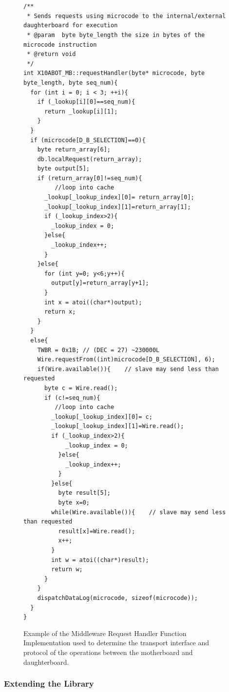 \begin{figure}
    \footnotesize
    {\fontsize{8}{6}\selectfont
    \begin{verbatim}


/**
 * Sends requests using microcode to the internal/external daughterboard for execution
 * @param  byte byte_length the size in bytes of the microcode instruction
 * @return void
 */
int X10ABOT_MB::requestHandler(byte* microcode, byte byte_length, byte seq_num){
  for (int i = 0; i < 3; ++i){
    if (_lookup[i][0]==seq_num){
      return _lookup[i][1];
    }
  }
  if (microcode[D_B_SELECTION]==0){
    byte return_array[6];
    db.localRequest(return_array);
    byte output[5];
    if (return_array[0]!=seq_num){      
         //loop into cache
      _lookup[_lookup_index][0]= return_array[0];
      _lookup[_lookup_index][1]=return_array[1];
      if (_lookup_index>2){
        _lookup_index = 0;
      }else{
        _lookup_index++;
      }
    }else{      
      for (int y=0; y<6;y++){
        output[y]=return_array[y+1];
      }
      int x = atoi((char*)output);
      return x;
    }
  }
  else{
    TWBR = 0x1B; // (DEC = 27) ~230000L
    Wire.requestFrom((int)microcode[D_B_SELECTION], 6);
    if(Wire.available()){    // slave may send less than requested
      byte c = Wire.read();
      if (c!=seq_num){
         //loop into cache
        _lookup[_lookup_index][0]= c;
        _lookup[_lookup_index][1]=Wire.read();
        if (_lookup_index>2){
            _lookup_index = 0;
          }else{
            _lookup_index++;
          }
        }else{
          byte result[5];
          byte x=0;
        while(Wire.available()){    // slave may send less than requested
          result[x]=Wire.read();
          x++;
        }
        int w = atoi((char*)result);
        return w;
      }
    }
    dispatchDataLog(microcode, sizeof(microcode));
  }
}
\end{verbatim}
    }
    \caption{Example of the Middleware Request Handler Function Implementation used to determine the transport interface and protocol of the operations between the motherboard and daughterboard.} \label{code:reqhandler}
    \end{figure}


	
	\subsubsection{Extending the Library} %
	\label{ssub:extending_the_library}
	
